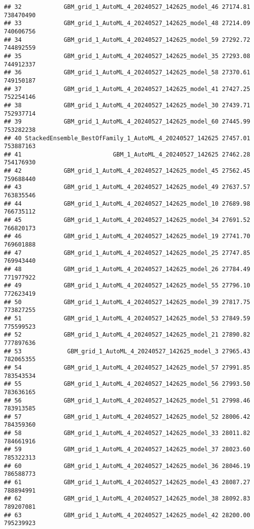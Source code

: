 \documentclass[
]{article}
\begin{document}
\begin{verbatim}
## 32            GBM_grid_1_AutoML_4_20240527_142625_model_46 27174.81  738470490
## 33            GBM_grid_1_AutoML_4_20240527_142625_model_48 27214.09  740606756
## 34            GBM_grid_1_AutoML_4_20240527_142625_model_59 27292.72  744892559
## 35            GBM_grid_1_AutoML_4_20240527_142625_model_35 27293.08  744912337
## 36            GBM_grid_1_AutoML_4_20240527_142625_model_58 27370.61  749150187
## 37            GBM_grid_1_AutoML_4_20240527_142625_model_41 27427.25  752254146
## 38            GBM_grid_1_AutoML_4_20240527_142625_model_30 27439.71  752937714
## 39            GBM_grid_1_AutoML_4_20240527_142625_model_60 27445.99  753282238
## 40 StackedEnsemble_BestOfFamily_1_AutoML_4_20240527_142625 27457.01  753887163
## 41                          GBM_1_AutoML_4_20240527_142625 27462.28  754176930
## 42            GBM_grid_1_AutoML_4_20240527_142625_model_45 27562.45  759688440
## 43            GBM_grid_1_AutoML_4_20240527_142625_model_49 27637.57  763835546
## 44            GBM_grid_1_AutoML_4_20240527_142625_model_10 27689.98  766735112
## 45            GBM_grid_1_AutoML_4_20240527_142625_model_34 27691.52  766820173
## 46            GBM_grid_1_AutoML_4_20240527_142625_model_19 27741.70  769601888
## 47            GBM_grid_1_AutoML_4_20240527_142625_model_25 27747.85  769943440
## 48            GBM_grid_1_AutoML_4_20240527_142625_model_26 27784.49  771977922
## 49            GBM_grid_1_AutoML_4_20240527_142625_model_55 27796.10  772623419
## 50            GBM_grid_1_AutoML_4_20240527_142625_model_39 27817.75  773827255
## 51            GBM_grid_1_AutoML_4_20240527_142625_model_53 27849.59  775599523
## 52            GBM_grid_1_AutoML_4_20240527_142625_model_21 27890.82  777897636
## 53             GBM_grid_1_AutoML_4_20240527_142625_model_3 27965.43  782065355
## 54            GBM_grid_1_AutoML_4_20240527_142625_model_57 27991.85  783543534
## 55            GBM_grid_1_AutoML_4_20240527_142625_model_56 27993.50  783636165
## 56            GBM_grid_1_AutoML_4_20240527_142625_model_51 27998.46  783913585
## 57            GBM_grid_1_AutoML_4_20240527_142625_model_52 28006.42  784359360
## 58            GBM_grid_1_AutoML_4_20240527_142625_model_33 28011.82  784661916
## 59            GBM_grid_1_AutoML_4_20240527_142625_model_37 28023.60  785322313
## 60            GBM_grid_1_AutoML_4_20240527_142625_model_36 28046.19  786588773
## 61            GBM_grid_1_AutoML_4_20240527_142625_model_43 28087.27  788894991
## 62            GBM_grid_1_AutoML_4_20240527_142625_model_38 28092.83  789207081
## 63            GBM_grid_1_AutoML_4_20240527_142625_model_42 28200.00  795239923

\end{verbatim}
\end{document}
